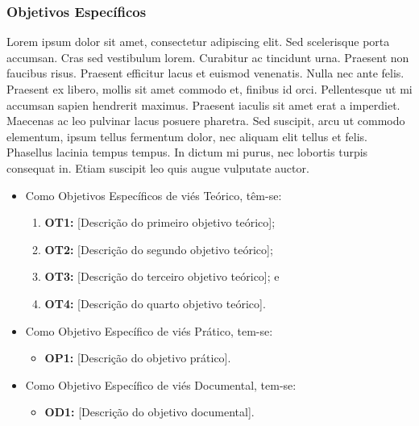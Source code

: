 \subsubsection{Objetivos Específicos}
\label{status-objetivo-especificos}

Lorem ipsum dolor sit amet, consectetur adipiscing elit. Sed scelerisque porta accumsan. Cras sed vestibulum lorem. Curabitur ac tincidunt urna. Praesent non faucibus risus. Praesent efficitur lacus et euismod venenatis. Nulla nec ante felis. Praesent ex libero, mollis sit amet commodo et, finibus id orci. Pellentesque ut mi accumsan sapien hendrerit maximus. Praesent iaculis sit amet erat a imperdiet. Maecenas ac leo pulvinar lacus posuere pharetra. Sed suscipit, arcu ut commodo elementum, ipsum tellus fermentum dolor, nec aliquam elit tellus et felis. Phasellus lacinia tempus tempus. In dictum mi purus, nec lobortis turpis consequat in. Etiam suscipit leo quis augue vulputate auctor.

\begin{itemize}
	\item Como Objetivos Específicos de viés Teórico, têm-se:
	\begin{enumerate}
		\item \textbf{OT1:} [Descrição do primeiro objetivo teórico];
		\item \textbf{OT2:} [Descrição do segundo objetivo teórico];
		\item \textbf{OT3:} [Descrição do terceiro objetivo teórico]; e
		\item \textbf{OT4:} [Descrição do quarto objetivo teórico].
	\end{enumerate}
	\item Como Objetivo Específico de viés Prático, tem-se:
	\begin{itemize}
		\item \textbf{OP1:} [Descrição do objetivo prático].
	\end{itemize}
	\item Como Objetivo Específico de viés Documental, tem-se:
	\begin{itemize}
		\item \textbf{OD1:} [Descrição do objetivo documental].
	\end{itemize}
\end{itemize}

